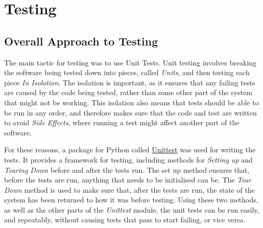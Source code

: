 \chapter{Testing}






\section{Overall Approach to Testing}

The main tactic for testing was to use Unit Tests. Unit testing involves breaking the software being tested down into pieces, called \emph{Units}, and then testing each piece \emph{In Isolation}\cite{Knupp2013}. The isolation is important, as it ensures that any failing tests are caused by the code being tested, rather than some other part of the system that might not be working. This isolation also means that tests should be able to be run in any order, and therefore makes sure that the code and test are written to avoid \emph{Side Effects}, where running a test might affect another part of the software.

For these reasons, a package for Python called \href{https://docs.python.org/3/library/unittest.html}{Unittest} was used for writing the tests. It provides a framework for testing, including methods for \emph{Setting up} and \emph{Tearing Down} before and after the tests run. The set up method ensures that, before the tests are run, anything that needs to be initialised can be. The \emph{Tear Down} method is used to make sure that, after the tests are run, the state of the system has been returned to how it was before testing. Using these two methods, as well as the other parts of the \emph{Unittest} module, the unit tests can be run easily, and repeatably, without causing tests that pass to start failing, or vice versa.

